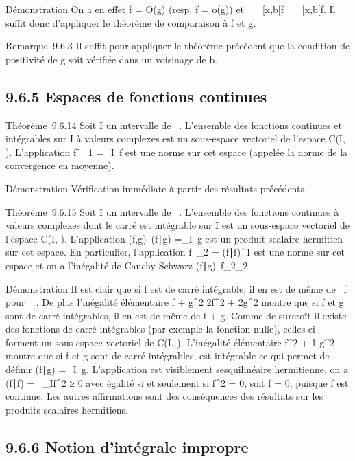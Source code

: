 \documentclass[]{article}
\begin{document}
Démonstration On a en effet f = O(g) (resp.
f = o(g)) et \left
\int ~
_[x,b[f\right
\leq\int ~
_[x,b[f. Il suffit donc d'appliquer le
théorème de comparaison à f et g.

Remarque~9.6.3 Il suffit pour appliquer le théorème précédent que la
condition de positivité de g soit vérifiée dans un voisinage de b.

\subsection{9.6.5 Espaces de fonctions continues}

Théorème~9.6.14 Soit I un intervalle de ~. L'ensemble des fonctions
continues et intégrables sur I à valeurs complexes est un sous-espace
vectoriel de l'espace C(I, ). L'application
f\mapsto~\f_1
=\int  _I~f est une
norme sur cet espace (appelée la norme de la convergence en moyenne).

Démonstration Vérification immédiate à partir des résultats précédents.

Théorème~9.6.15 Soit I un intervalle de ~. L'ensemble des fonctions
continues à valeurs complexes dont le carré est intégrable sur I est un
sous-espace vectoriel de l'espace C(I, ). L'application
(f,g)\mapsto~(f\mathrel∣g)
=\int  _I\overlinef~g
est un produit scalaire hermitien sur cet espace. En particulier,
l'application
f\mapsto~\f_2
= (f∣f)^1 est une norme sur cet
espace et on a l'inégalité de Cauchy-Schwarz
(f∣g)\leq\
f_2\g_2.

Démonstration Il est clair que si f est de carré intégrable, il en est
de même de \alpha~f pour \alpha~ \in \mathbb{C}. De plus l'inégalité élémentaire f +
g^2 \leq 2f^2 +
2g^2 montre que si f et g sont de carré
intégrables, il en est de même de f + g. Comme de surcroît il existe des
fonctions de carré intégrables (par exemple la fonction nulle),
celles-ci forment un sous-espace vectoriel de C(I, ). L'inégalité
élémentaire \overlinefg\leq 1
 f^2 + 1
\over 2 g^2 montre que
si f et g sont de carré intégrables, \overlinegf est
intégrable ce qui permet de définir (f∣g)
=\int  _I\overlinef~g.
L'application est visiblement sesquilinéaire hermitienne, on a
(f∣f) =\int ~
_If^2 ≥ 0 avec égalité si et
seulement si f^2 = 0, soit f = 0, puisque
f est continue. Les autres affirmations sont des conséquences des
résultats sur les produits scalaires hermitiens.

\subsection{9.6.6 Notion d'intégrale impropre}
\end{document}
